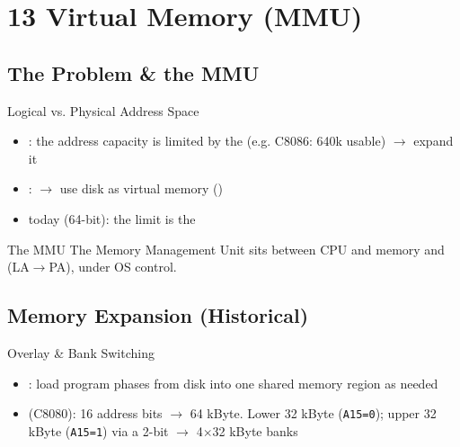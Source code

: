 \section{13 Virtual Memory (MMU)}

\subsection{The Problem \& the MMU}


\begin{concept}{Logical vs. Physical Address Space}
    \begin{itemize}
        \item {}: the address capacity is limited by
              the  (e.g. C8086: 640k usable) $\to$ expand it
        \item {}:  $\to$ use disk as virtual memory ()
        \item today (64-bit): the limit is the 
    \end{itemize}
\end{concept}

\begin{definition}{The MMU}
    The Memory Management Unit sits between CPU and memory and  (LA$\to$PA), under OS control.
\end{definition}

\multend

\subsection{Memory Expansion (Historical)}

\begin{definition}{Overlay \& Bank Switching}
    \begin{itemize}
        \item {}: load program phases from disk into one shared
              memory region as needed
        \item {} (C8080): 16 address bits $\to$ 64 kByte.
              Lower 32 kByte  (\texttt{A15=0}); upper 32 kByte
               (\texttt{A15=1}) via a 2-bit 
              $\to$ 4$\times$32 kByte banks
    \end{itemize}
\end{definition}

